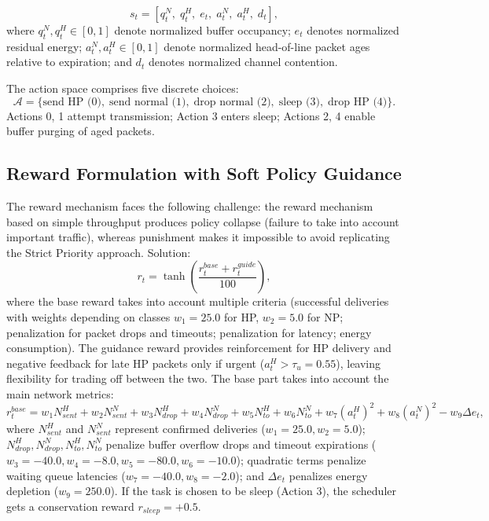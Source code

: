\documentclass[runningheads,a4paper]{llncs}
\begin{document}
\begin{equation}
s_t = \left[q_t^N,\; q_t^H,\; e_t,\; a_t^N,\; a_t^H,\; d_t\right],
\end{equation}
where $q_t^N, q_t^H \in [0,1]$ denote normalized buffer occupancy; $e_t$ denotes
normalized residual energy; $a_t^N, a_t^H \in [0,1]$ denote normalized head-of-line
packet ages relative to expiration; and $d_t$ denotes normalized channel contention.

The action space comprises five discrete choices:
\begin{equation}
\mathcal{A} = \{\text{send HP (0)},\; \text{send normal (1)},\; \text{drop normal (2)},\; \text{sleep (3)},\; \text{drop HP (4)}\}.
\end{equation}
Actions 0, 1 attempt transmission; Action 3 enters sleep; Actions 2, 4 enable
buffer purging of aged packets.

\subsection{Reward Formulation with Soft Policy Guidance}
The reward mechanism faces the following challenge: the reward mechanism
based on simple throughput produces policy collapse (failure to take into account
important traffic), whereas punishment makes it impossible to avoid replicating
the Strict Priority approach. Solution:
\begin{equation}
r_t = \tanh\left(\frac{r_t^{base} + r_t^{guide}}{100}\right),
\end{equation}
where the base reward takes into account multiple criteria (successful deliveries
with weights depending on classes $w_1 = 25.0$ for HP, $w_2 = 5.0$ for NP;
penalization for packet drops and timeouts; penalization for latency; energy
consumption). The guidance reward provides reinforcement for HP delivery and
negative feedback for late HP packets only if urgent ($a_t^H > \tau_u = 0.55$),
leaving flexibility for trading off between the two. The base part takes into
account the main network metrics:
\begin{equation}
r_t^{base} = w_1 N_{sent}^H + w_2 N_{sent}^N + w_3 N_{drop}^H + w_4 N_{drop}^N + w_5 N_{to}^H + w_6 N_{to}^N + w_7 (a_t^H)^2 + w_8 (a_t^N)^2 - w_9 \Delta e_t,
\end{equation}
where $N_{sent}^H$ and $N_{sent}^N$ represent confirmed deliveries ($w_1 = 25.0, w_2 = 5.0$);
$N_{drop}^H, N_{drop}^N, N_{to}^H, N_{to}^N$ penalize buffer overflow drops and timeout
expirations ($w_3 = -40.0, w_4 = -8.0, w_5 = -80.0, w_6 = -10.0$); quadratic
terms penalize waiting queue latencies ($w_7 = -40.0, w_8 = -2.0$); and $\Delta e_t$
penalizes energy depletion ($w_9 = 250.0$). If the task is chosen to be sleep
(Action 3), the scheduler gets a conservation reward $r_{sleep} = +0.5$.
\end{document}
